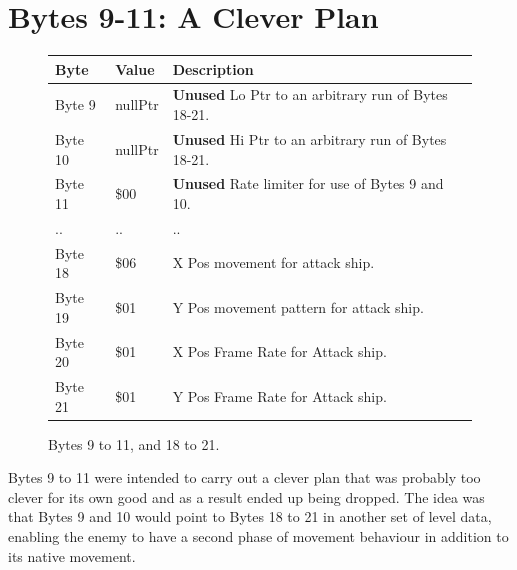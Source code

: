 \section{Bytes 9-11: A Clever Plan}
\begin{figure}[H]
  {
    \setlength{\tabcolsep}{3.0pt}
    \setlength\cmidrulewidth{\heavyrulewidth} %
    \begin{adjustbox}{width=10cm, center}

      \begin{tabular}{lll}
        \toprule
        Byte    & Value                     & Description                                                        \\
        \midrule
        Byte 9  & nullPtr\index{nullPtr}                   & \textbf{Unused} Lo Ptr to an arbitrary run of Bytes 18-21.\\
        Byte 10 & nullPtr\index{nullPtr}                   & \textbf{Unused} Hi Ptr to an arbitrary run of Bytes 18-21.\\
        Byte 11 & \$00                       & \textbf{Unused} Rate limiter for use of Bytes 9 and 10. \\
        .. & ..                       & ..\\
        Byte 18 & \$06                       & X Pos movement\index{movement} for attack ship.                                    \\
        Byte 19 & \$01                       & Y Pos movement\index{movement} pattern\index{pattern} for attack ship.                            \\
        Byte 20 & \$01                       & X Pos Frame Rate for Attack ship.                                  \\
        Byte 21 & \$01                       & Y Pos Frame Rate for Attack ship.                                  \\
        \bottomrule
      \end{tabular}
    \end{adjustbox}
  }\caption{Bytes 9 to 11, and 18 to 21.}
\end{figure}
Bytes 9 to 11 were intended to carry out a clever plan that was probably too clever for its own
good and as a result ended up being dropped. The idea was that Bytes 9 and 10 would point to 
Bytes 18 to 21 in another set of level data, enabling the enemy to have a second phase of movement
behaviour in addition to its native movement.

